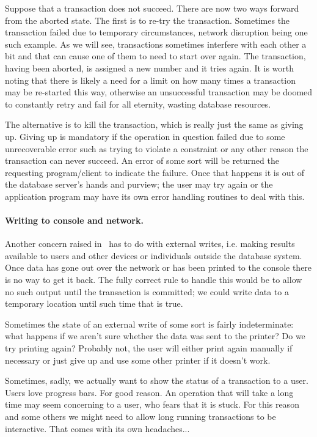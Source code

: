 Suppose that a transaction does not succeed. There are now two ways forward from the aborted state. The first is to re-try the transaction. Sometimes the transaction failed due to temporary circumstances, network disruption being one such example. As we will see, transactions sometimes interfere with each other a bit and that can cause one of them to need to start over again. The transaction, having been aborted, is assigned a new number and it tries again. It is worth noting that there is likely a need for a limit on how many times a transaction may be re-started this way, otherwise an unsuccessful transaction may be doomed to constantly retry and fail for all eternity, wasting database resources.

The alternative is to kill the transaction, which is really just the same as giving up. Giving up is mandatory if the operation in question failed due to some unrecoverable error such as trying to violate a constraint or any other reason the transaction can never succeed. An error of some sort will be returned the requesting program/client to indicate the failure. Once that happens it is out of the database server's hands and purview; the user may try again or the application program may have its own error handling routines to deal with this.

\paragraph{Writing to console and network.}

Another concern raised in~\cite{dsc} has to do with external writes, i.e. making results available to users and other devices or individuals outside the database system. Once data has gone out over the network or has been printed to the console there is no way to get it back. The fully correct rule to handle this would be to allow no such output until the transaction is committed; we could write data to a temporary location until such time that is true. 

Sometimes the state of an external write of some sort is fairly indeterminate: what happens if we aren't sure whether the data was sent to the printer? Do we try printing again? Probably not, the user will either print again manually if necessary or just give up and use some other printer if it doesn't work. 

Sometimes, sadly, we actually want to show the status of a transaction to a user. Users love progress bars. For good reason. An operation that will take a long time may seem concerning to a user, who fears that it is stuck. For this reason and some others we might need to allow long running transactions to be interactive. That comes with its own headaches...





